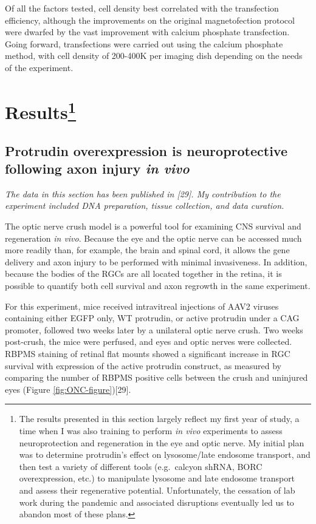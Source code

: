 \documentclass[
  12pt,
  a4paper,
]{book}
\begin{document}
Of all the factors tested, cell density best correlated with the transfection efficiency, although the improvements on the original magnetofection protocol were dwarfed by the vast improvement with calcium phosphate transfection. Going forward, transfections were carried out using the calcium phosphate method, with cell density of 200-400K per imaging dish depending on the needs of the experiment.

\hypertarget{results}{%
\section[Results]{\texorpdfstring{Results\footnote{The results presented in this section largely reflect my first year of study, a time when I was also training to perform \emph{in vivo} experiments to assess neuroprotection and regeneration in the eye and optic nerve. My initial plan was to determine protrudin's effect on lysosome/late endosome transport, and then test a variety of different tools (e.g.~calcyon shRNA, BORC overexpression, etc.) to manipulate lysosome and late endosome transport and assess their regenerative potential. Unfortunately, the cessation of lab work during the pandemic and associated disruptions eventually led us to abandon most of these plans.}}{Results}}\label{results}}

\hypertarget{protrudin-ONC}{%
\subsection{\texorpdfstring{Protrudin overexpression is neuroprotective following axon injury \emph{in vivo}}{Protrudin overexpression is neuroprotective following axon injury in vivo}}\label{protrudin-ONC}}

\emph{The data in this section has been published in {[}29{]}. My contribution to the experiment included DNA preparation, tissue collection, and data curation.}

The optic nerve crush model is a powerful tool for examining CNS survival and regeneration \emph{in vivo}. Because the eye and the optic nerve can be accessed much more readily than, for example, the brain and spinal cord, it allows the gene delivery and axon injury to be performed with minimal invasiveness. In addition, because the bodies of the RGCs are all located together in the retina, it is possible to quantify both cell survival and axon regrowth in the same experiment.

For this experiment, mice received intravitreal injections of AAV2 viruses containing either EGFP only, WT protrudin, or active protrudin under a CAG promoter, followed two weeks later by a unilateral optic nerve crush. Two weeks post-crush, the mice were perfused, and eyes and optic nerves were collected. RBPMS staining of retinal flat mounts showed a significant increase in RGC survival with expression of the active protrudin construct, as measured by comparing the number of RBPMS positive cells between the crush and uninjured eyes (Figure \ref{fig:ONC-figure}){[}29{]}.
\end{document}
